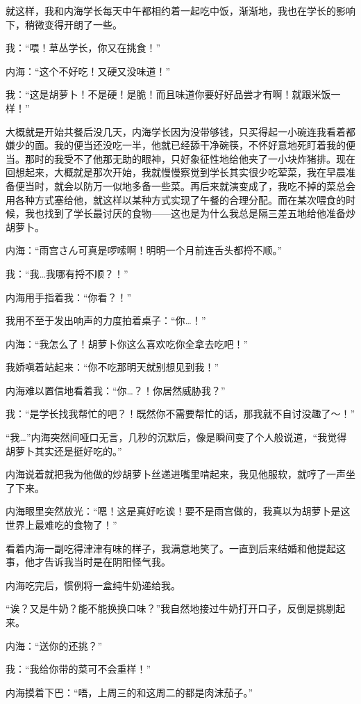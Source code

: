 就这样，我和内海学长每天中午都相约着一起吃中饭，渐渐地，我也在学长的影响下，稍微变得开朗了一些。

我：“喂！草丛学长，你又在挑食！”

内海：“这个不好吃！又硬又没味道！”

我：“这是胡萝卜！不是硬！是脆！而且味道你要好好品尝才有啊！就跟米饭一样！”

大概就是开始共餐后没几天，内海学长因为没带够钱，只买得起一小碗连我看着都嫌少的面。我的便当还没吃一半，他就已经舔干净碗筷，不怀好意地死盯着我的便当。那时的我受不了他那无助的眼神，只好象征性地给他夹了一小块炸猪排。现在回想起来，大概就是那次开始，我就慢慢察觉到学长其实很少吃荤菜，我在早晨准备便当时，就会以防万一似地多备一些菜。再后来就演变成了，我吃不掉的菜总会用各种方式塞给他，就这样以某种方式实现了午餐的合理分配。而在某次喂食的时候，我也找到了学长最讨厌的食物——这也是为什么我总是隔三差五地给他准备炒胡萝卜。

内海：“雨宫さん可真是啰嗦啊！明明一个月前连舌头都捋不顺。”

我：“我…我哪有捋不顺？！”

内海用手指着我：“你看？！”

我用不至于发出响声的力度拍着桌子：“你…！”

内海：“我怎么了！胡萝卜你这么喜欢吃你全拿去吃吧！”

我娇嗔着站起来：“你不吃那明天就别想见到我！”

内海难以置信地看着我：“你…？！你居然威胁我？”

我：“是学长找我帮忙的吧？！既然你不需要帮忙的话，那我就不自讨没趣了～！”

“我…”内海突然间哑口无言，几秒的沉默后，像是瞬间变了个人般说道，“我觉得胡萝卜其实还是挺好吃的。”

内海说着就把我为他做的炒胡萝卜丝递进嘴里啃起来，我见他服软，就哼了一声坐了下来。

内海眼里突然放光：“嗯！这是真好吃诶！要不是雨宫做的，我真以为胡萝卜是这世界上最难吃的食物了！”

看着内海一副吃得津津有味的样子，我满意地笑了。一直到后来结婚和他提起这事，他才告诉我当时是在阴阳怪气我。

内海吃完后，惯例将一盒纯牛奶递给我。

“诶？又是牛奶？能不能换换口味？”我自然地接过牛奶打开口子，反倒是挑剔起来。

内海：“送你的还挑？”

我：“我给你带的菜可不会重样！”

内海摸着下巴：“唔，上周三的和这周二的都是肉沫茄子。”

